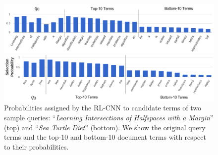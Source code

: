 \documentclass[11pt,letterpaper]{article}
\begin{document}
\begin{figure}
\begin{center}
\centerline{\includegraphics[width=0.68\paperwidth]{probs}}
\vskip 0.1in
\centerline{\includegraphics[width=0.73\paperwidth]{probs2}}
\vskip -0.1in
\caption{Probabilities assigned by the RL-CNN to candidate terms of two sample queries: ``\textit{Learning Intersections of Halfspaces with a Margin}'' (top) and ``\textit{Sea Turtle Diet}'' (bottom). We show the original query terms and the top-10 and bottom-10 document terms with respect to their probabilities. %
}
\label{fig:probs}
\end{center}

\vskip -4mm
\end{figure}
\end{document}

